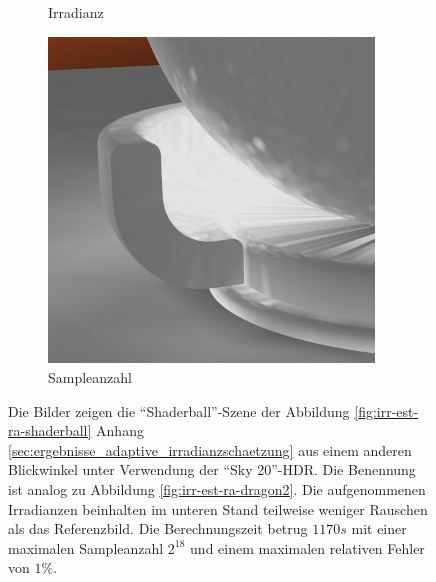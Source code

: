 \begin{figure}[h]
\begin{subfigure}[t]{0.33\textwidth}
				\caption{Irradianz}
			\end{subfigure}
			\begin{subfigure}[t]{0.33\textwidth}
				\center
				\includegraphics[width=0.95\textwidth]{pic/irr_est-ra-shaderball2-scount.png}
				\caption{Sampleanzahl}
			\end{subfigure}
			\caption[Zweite adaptive Vertex-Irradiance-Map anhand der \enquote{Shaderball}-Szene]{Die Bilder zeigen die \enquote{Shaderball}-Szene der Abbildung \ref{fig:irr-est-ra-shaderball} Anhang \ref{sec:ergebnisse_adaptive_irradianzschaetzung} aus einem anderen Blickwinkel unter Verwendung der \enquote{Sky 20}-HDR. Die Benennung ist analog zu Abbildung \ref{fig:irr-est-ra-dragon2}. Die aufgenommenen Irradianzen beinhalten im unteren Stand teilweise weniger Rauschen als das Referenzbild. Die Berechnungszeit betrug $1170\unit{s}$ mit einer maximalen Sampleanzahl $2^{18}$ und einem maximalen relativen Fehler von $1\unit{\%}$.}
			\label{fig:irr-est-ra-shaderball2}
		\end{figure}

